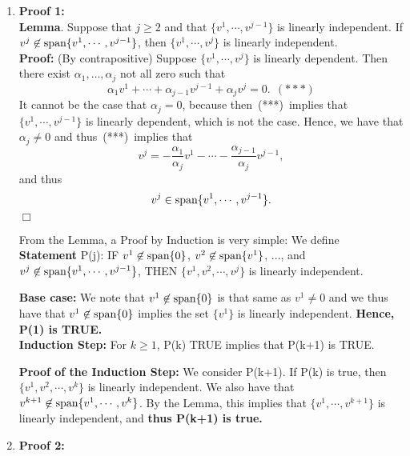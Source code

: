\documentclass[letterpaper]{article}
\begin{document}
\begin{enumerate}
\setlength{\itemsep}{.15in}
\renewcommand{\labelenumi}{(\alph{enumi})}
\item[]  \textbf{Proof 1:}\\

\noindent \textbf{Lemma}. Suppose that $j\ge 2$ and that $\{v^1, \cdots, v^{j-1}\}$ is linearly independent. If $v^j\not \in \textrm{span} \{ v^1, \cdots, v^{j-1} \}$, then $\{v^1, \cdots, v^{j}\}$ is linearly independent.\\

\textbf{Proof:} (By contrapositive) Suppose $\{v^1, \cdots, v^{j}\}$ is linearly dependent. Then there exist $\alpha_1, \ldots, \alpha_j$ not all zero such that
$$\alpha_1 v^1 + \cdots + \alpha_{j-1} v^{j-1} + \alpha_j v^{j}=0. ~~(***)$$
It cannot be the case that $\alpha_j=0$, because then~(***)~implies that $\{v^1, \cdots, v^{j-1}\}$ is linearly dependent, which is not the case. Hence, we have that $\alpha_j \not = 0$ and thus~(***)~implies that
$$ v^{j}=-\frac{\alpha_1}{\alpha_j} v^1 - \cdots - \frac{\alpha_{j-1}}{\alpha_j} v^{j-1},$$
and thus
$$v^j \in \textrm{span} \{ v^1, \cdots, v^{j-1} \}.$$
\hfill $\Box$

From the Lemma, a Proof by Induction is very simple: We define \\

\textbf{Statement} P(j): IF $v^1 \not \in \textrm{span} \{ 0 \}$, $v^2 \not \in \textrm{span} \{ v^1 \}$, $...$,  and $v^j\not \in \textrm{span} \{ v^1, \cdots, v^{j-1} \}$, THEN $\{v^1, v^2, \cdots, v^{j}\}$ is linearly independent.

\textbf{Base case:} We note that $v^1 \not \in \textrm{span} \{ 0 \}$ is that same as $v^1 \not = 0$  and we thus have that $v^1\not \in \textrm{span} \{ 0 \}$ implies the set $\{ v^1\}$ is linearly independent. \textbf{Hence, P(1) is TRUE.}\\

\textbf{Induction Step:} For $k\ge 1$, P(k) TRUE implies that P(k+1) is TRUE.

\textbf{Proof of the Induction Step:} We consider P(k+1). If P(k) is true, then $\{v^1, v^2, \cdots, v^{k}\}$ is linearly independent. We also have that $v^{k+1}\not \in \textrm{span} \{ v^1, \cdots, v^{k} \}$. By the Lemma, this implies that $\{v^1, \cdots, v^{k+1}\}$ is linearly independent, and \textbf{thus P(k+1) is true.} \\






\item[] \textbf{Proof 2:}\\


\end{enumerate}
\end{document}
